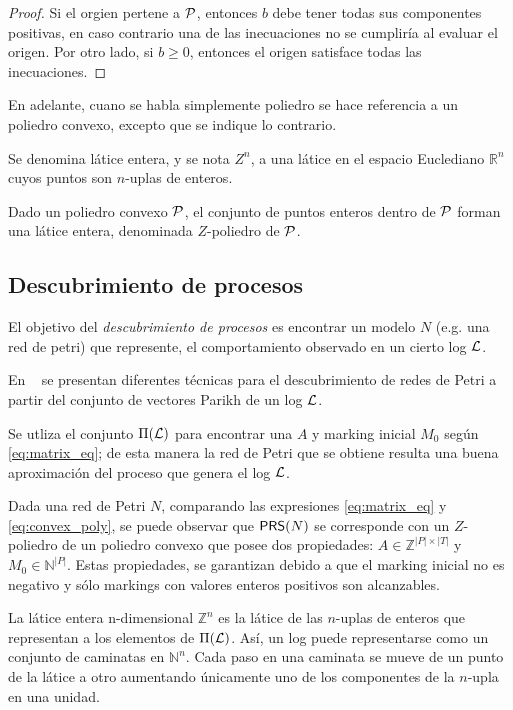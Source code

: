 \begin{proof}
    Si el orgien pertene a ${\mathcal P}$, entonces $b$ debe tener todas sus componentes positivas,
    en caso contrario una de las inecuaciones no se cumpliría al evaluar el origen.
    Por otro lado, si $b \geq 0$, entonces el origen satisface todas las inecuaciones.
\end{proof}

En adelante, cuano se habla simplemente poliedro se hace referencia a un poliedro convexo,
excepto que se indique lo contrario.

Se denomina látice entera, y se nota $Z^n$, a una látice en el espacio Euclediano $\mathbb{R}^n$
cuyos puntos son $n$-uplas de enteros. 

Dado un poliedro convexo ${\mathcal P}$, el conjunto de puntos enteros dentro de ${\mathcal P}$
forman una látice entera, denominada $Z$-poliedro de ${\mathcal P}$.

\subsection{Descubrimiento de procesos} 
\label{sec:2.discovery discovery}

El objetivo del \textit{descubrimiento de procesos} es encontrar un 
modelo $N$ (e.g. una red de petri) que represente, el comportamiento 
observado en un cierto log ${\mathcal L}$.

En ~\cite{CarmonaC14} se presentan diferentes técnicas 
para el descubrimiento de redes de Petri a partir del 
conjunto de vectores Parikh de un log ${\mathcal L}$.

Se utliza el conjunto $\Pi({\mathcal L})$ para encontrar
una $A$ y marking inicial $M_0$ según \eqref{eq:matrix_eq};
de esta manera la red de Petri que se obtiene resulta 
una buena aproximación del proceso que genera el log ${\mathcal L}$.

Dada una red de Petri $N$, comparando las expresiones \eqref{eq:matrix_eq}
y \eqref{eq:convex_poly}, se puede observar que $\textsf{PRS}(N)$ se corresponde con
un $Z$-poliedro de un poliedro convexo que posee dos propiedades:
\mbox{$A \in \mathbb{Z}^{|P|\times|T|}$} y \mbox{$M_0 \in \mathbb{N}^{|P|}$}.
Estas propiedades, se garantizan debido a que el marking inicial no es negativo 
y sólo markings con valores enteros positivos son alcanzables.


La látice entera n-dimensional $\mathbb{Z}^n$ es la látice de las $n$-uplas
de enteros que representan a los elementos de $\Pi({\mathcal L})$. Así, un log 
puede representarse como un conjunto de caminatas en $\mathbb{N}^n$. Cada paso en
una caminata se mueve de un punto de la látice a otro aumentando únicamente uno de
los componentes de la $n$-upla en una unidad.

